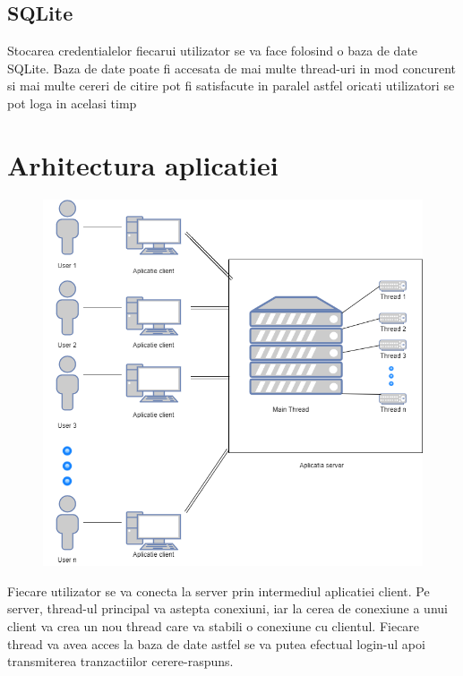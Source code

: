 \documentclass{llncs}
\begin{document}
\subsection{SQLite}
%
Stocarea credentialelor fiecarui utilizator se va face folosind o baza de date SQLite. Baza de date poate fi accesata de mai multe thread-uri in mod concurent si mai multe cereri de citire pot fi satisfacute in paralel astfel oricati utilizatori se pot loga in acelasi timp
%
\section{Arhitectura aplicatiei}
%
\begin{figure}
\includegraphics[width=\linewidth]{diagram.png}
\end{figure}
Fiecare utilizator se va conecta la server prin intermediul aplicatiei client. Pe server, thread-ul principal va astepta conexiuni, iar la cerea de conexiune a unui client va crea un nou thread care va stabili o conexiune cu clientul. Fiecare thread va avea acces la baza de date astfel se va putea efectual login-ul apoi transmiterea tranzactiilor cerere-raspuns.
%
\pagebreak
\end{document}

